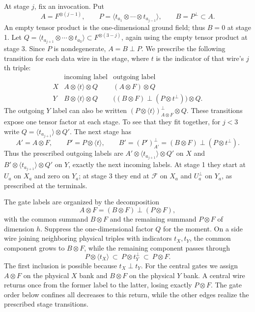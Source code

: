 At stage $j$, fix an invocation.  Put
\[
 A=F^{\otimes(j-1)},\qquad
 P=\langle t_{a_1}\otimes\cdots\otimes t_{a_{j-1}}\rangle,
 \qquad B=P^\perp\subset A.
\]
An empty tensor product is the one-dimensional ground field; thus
$B=0$ at stage 1.  Let
$Q=\langle t_{a_{j+1}}\otimes\cdots\otimes t_{a_3}\rangle
\subset F^{\otimes(3-j)}$, again using the empty tensor product at
stage 3.  Since $P$ is nondegenerate,
$A=B\mathbin{\perp}P$.  
We prescribe the following transition for each data wire in the stage,
where $t$ is the indicator of that wire's $j$th triple:
\[
\begin{array}{c|c|c}
 &\text{incoming label}&\text{outgoing label}\\ \hline
 X&A\otimes\langle t\rangle\otimes Q&(A\otimes F)\otimes Q\\
 Y&B\otimes\langle t\rangle\otimes Q&
 \bigl((B\otimes F)\mathbin{\perp}(P\otimes t^\perp)\bigr)\otimes Q.
\end{array}
\]
The outgoing $Y$ label can also be written
$(P\otimes\langle t\rangle)^\perp_{A\otimes F}\otimes Q$.
These transitions expose one tensor factor at each stage. To see that
they fit together, for $j<3$ write
$Q=\langle t_{a_{j+1}}\rangle\otimes Q'$. The next stage has
\[
 A'=A\otimes F,\qquad
 P'=P\otimes\langle t\rangle,\qquad
 B'=(P')^\perp_{A'}
    =(B\otimes F)\mathbin{\perp}(P\otimes t^\perp).
\]
Thus the prescribed outgoing labels are
$A'\otimes\langle t_{a_{j+1}}\rangle\otimes Q'$ on $X$ and
$B'\otimes\langle t_{a_{j+1}}\rangle\otimes Q'$ on $Y$, exactly
the next incoming labels. At stage 1 they start at $U_a$ on $X_a$
and zero on $Y_a$; at stage 3 they end at $\mathcal F$ on $X_a$
and $U_a^\perp$ on $Y_a$, as prescribed at the terminals.

The gate labels are organized by the decomposition
\[
 A\otimes F=(B\otimes F)\mathbin{\perp}(P\otimes F),
\]
with the common summand $B\otimes F$ and the remaining summand
$P\otimes F$ of dimension $h$. Suppress the one-dimensional factor
$Q$ for the moment. On a side wire joining neighboring physical triples
with indicators $t_X,t_Y$, the common component grows to $B\otimes F$,
while the remaining component passes through
\[
 P\otimes\langle t_X\rangle
 \ \subset\ P\otimes t_Y^\perp
 \ \subset\ P\otimes F.
\]
The first inclusion is possible because $t_X\perp t_Y$.
For the central gates we assign $A\otimes F$ on the physical $X$
bank and $B\otimes F$ on the physical $Y$ bank. A central wire
returns once from the former label to the latter, losing exactly
$P\otimes F$. The gate order below confines all decreases to this
return, while the other edges realize the prescribed stage transitions.

